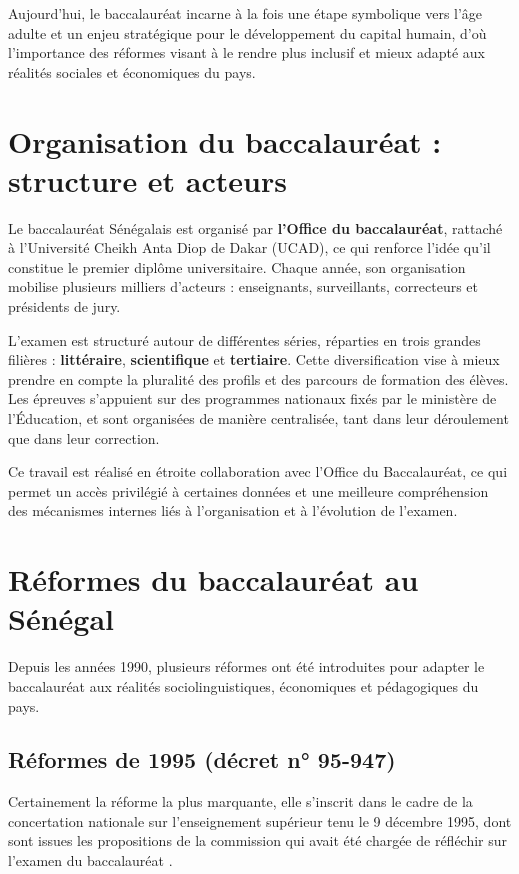 Aujourd’hui, le baccalauréat incarne à la fois une étape symbolique vers l’âge adulte et un enjeu stratégique pour le développement du capital humain, d’où l’importance des réformes visant à le rendre plus inclusif et mieux adapté aux réalités sociales et économiques du pays.

\section{Organisation du baccalauréat : structure et acteurs}

Le baccalauréat Sénégalais est organisé par \textbf{l'Office du baccalauréat}, rattaché à l'Université Cheikh Anta Diop de Dakar (UCAD), ce qui renforce l'idée qu'il constitue le premier diplôme universitaire.
Chaque année, son organisation mobilise plusieurs milliers d’acteurs : enseignants, surveillants, correcteurs et présidents de jury.

L’examen est structuré autour de différentes séries, réparties en trois grandes filières : \textbf{littéraire}, \textbf{scientifique} et \textbf{tertiaire}. 
Cette diversification vise à mieux prendre en compte la pluralité des profils et des parcours de formation des élèves. Les épreuves s’appuient sur des programmes nationaux fixés par le ministère de l'Éducation, et sont organisées de manière centralisée, tant dans leur déroulement que dans leur correction.

Ce travail est réalisé en étroite collaboration avec l’Office du Baccalauréat, ce qui permet un accès privilégié à certaines données et une meilleure compréhension des mécanismes internes liés à l’organisation et à l’évolution de l’examen.

\section{Réformes du baccalauréat au Sénégal}

Depuis les années 1990, plusieurs réformes ont été introduites pour adapter le baccalauréat aux réalités sociolinguistiques, 
économiques et pédagogiques du pays.

\subsection{Réformes de 1995 (décret n° 95-947)}

Certainement la réforme la plus marquante, elle s'inscrit dans le cadre de la concertation nationale sur l'enseignement supérieur tenu le 9 décembre 1995, 
dont sont issues les propositions de la commission qui avait été chargée de réfléchir sur l'examen du baccalauréat \cite{decret95}.

